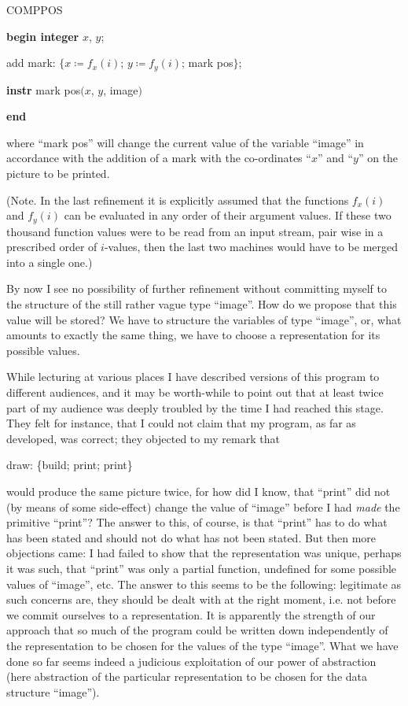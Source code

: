 COMPPOS
\nopagebreak

\textbf{begin integer} $x$, $y$;
\nopagebreak

\quad add mark: $\{x \coloneq f_x(i)$; $y \coloneq f_y(i)$; mark pos$\}$;

\quad\textbf{instr} mark pos$(x$, $y$, image$)$

\textbf{end}

\noindent
where ``mark pos'' will change the current value of the variable ``image'' in accordance with the addition of a mark with the co-ordinates ``$x$'' and ``$y$'' on the picture to be printed.

(Note. In the last refinement it is explicitly assumed that the functions $f_x(i)$ and $f_y(i)$ can be evaluated in any order of their argument values. If these two thousand function values were to be read from an input stream, pair wise in a prescribed order of $i$-values, then the last two machines would have to be merged into a single one.)

By now I see no possibility of further refinement without committing myself to the structure of the still rather vague type ``image''. How do we propose that this value will be stored? We have to structure the variables of type ``image'', or, what amounts to exactly the same thing, we have to choose a representation for its possible values.

While lecturing at various places I have described versions of this program to different audiences, and it may be worth-while to point out that at least twice part of my audience was deeply troubled by the time I had reached this stage. They felt for instance, that I could not claim that my program, as far as developed, was correct; they objected to my remark that

draw: \{build; print; print\}

\noindent
would produce the same picture twice, for how did I know, that ``print'' did not (by means of some side-effect) change the value of ``image'' before I had \textit{made} the primitive ``print''? The answer to this, of course, is that ``print'' has to do what has been stated and should not do what has not been stated. But then more objections came: I had failed to show that the representation was unique, perhaps it was such, that ``print'' was only a partial function, undefined for some possible values of ``image'', etc. The answer to this seems to be the following: legitimate as such concerns are, they should be dealt with at the right moment, i.e. not before we commit ourselves to a representation. It is apparently the strength of our approach that so much of the program could be written down independently of the representation to be chosen for the values of the type ``image''. What we have done so far seems indeed a judicious exploitation of our power of abstraction (here abstraction of the particular representation to be chosen for the data structure ``image'').

